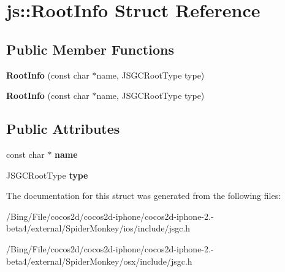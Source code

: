 \hypertarget{structjs_1_1_root_info}{\section{js\-:\-:Root\-Info Struct Reference}
\label{structjs_1_1_root_info}
}
\subsection*{Public Member Functions}
\begin{DoxyCompactItemize}
\item 
\hypertarget{structjs_1_1_root_info_a7e7070ca1189a0b3982a364eac8663af}{{\bfseries Root\-Info} (const char $\ast$name, J\-S\-G\-C\-Root\-Type type)}\label{structjs_1_1_root_info_a7e7070ca1189a0b3982a364eac8663af}

\item 
\hypertarget{structjs_1_1_root_info_a7e7070ca1189a0b3982a364eac8663af}{{\bfseries Root\-Info} (const char $\ast$name, J\-S\-G\-C\-Root\-Type type)}\label{structjs_1_1_root_info_a7e7070ca1189a0b3982a364eac8663af}

\end{DoxyCompactItemize}
\subsection*{Public Attributes}
\begin{DoxyCompactItemize}
\item 
\hypertarget{structjs_1_1_root_info_a32a74f972198de52333a58a4e1fa42f5}{const char $\ast$ {\bfseries name}}\label{structjs_1_1_root_info_a32a74f972198de52333a58a4e1fa42f5}

\item 
\hypertarget{structjs_1_1_root_info_aadd1863e6d4b2c29ca512443228a759c}{J\-S\-G\-C\-Root\-Type {\bfseries type}}\label{structjs_1_1_root_info_aadd1863e6d4b2c29ca512443228a759c}

\end{DoxyCompactItemize}


The documentation for this struct was generated from the following files\-:\begin{DoxyCompactItemize}
\item 
/\-Bing/\-File/cocos2d/cocos2d-\/iphone/cocos2d-\/iphone-\/2.-\/beta4/external/\-Spider\-Monkey/ios/include/jsgc.\-h\item 
/\-Bing/\-File/cocos2d/cocos2d-\/iphone/cocos2d-\/iphone-\/2.-\/beta4/external/\-Spider\-Monkey/osx/include/jsgc.\-h\end{DoxyCompactItemize}
